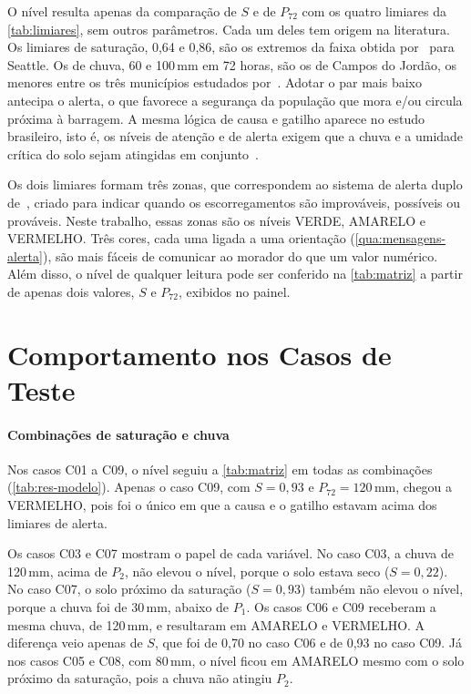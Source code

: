 O nível resulta apenas da comparação de $S$ e de $P_{72}$ com os quatro
limiares da \autoref{tab:limiares}, sem outros parâmetros. Cada um deles
tem origem na literatura.
Os limiares de saturação, 0,64 e 0,86, são os extremos da faixa obtida
por~ para Seattle. Os de
chuva, 60 e 100\,mm em 72 horas, são os de Campos do Jordão, os menores
entre os três municípios estudados por~.
Adotar o par mais baixo antecipa o alerta, o que favorece a segurança da
população que mora e/ou circula próxima à barragem. A mesma lógica de causa e gatilho aparece no estudo brasileiro, isto é, os níveis de atenção e de alerta exigem que a chuva e a
umidade crítica do solo sejam atingidas em conjunto~\cite[p.~74, Tabela~3]{mendes2020proposicao}.

Os dois limiares formam três zonas, que correspondem ao sistema de alerta
duplo de~, criado para indicar
quando os escorregamentos são improváveis, possíveis ou prováveis. Neste
trabalho, essas zonas são os níveis VERDE, AMARELO e VERMELHO.
Três cores, cada uma ligada a uma orientação
(\autoref{qua:mensagens-alerta}), são mais fáceis de comunicar ao morador
do que um valor numérico. Além disso, o nível de qualquer leitura pode
ser conferido na \autoref{tab:matriz} a partir de apenas dois valores,
$S$ e $P_{72}$, exibidos no painel.

\section{Comportamento nos Casos de Teste}
\label{sec:disc-casos}

\paragraph*{Combinações de saturação e chuva}

Nos casos C01 a C09, o nível seguiu a \autoref{tab:matriz} em todas as
combinações (\autoref{tab:res-modelo}). Apenas o caso C09, com
$S = 0{,}93$ e $P_{72} = 120$\,mm, chegou a VERMELHO, pois foi o único em
que a causa e o gatilho estavam acima dos limiares de alerta.

Os casos C03 e C07 mostram o papel de cada variável. No caso C03, a
chuva de 120\,mm, acima de $P_2$, não elevou o nível, porque o solo
estava seco ($S = 0{,}22$). No caso C07, o solo próximo da saturação
($S = 0{,}93$) também não elevou o nível, porque a chuva foi de
30\,mm, abaixo de $P_1$.
Os casos C06 e C09 receberam a mesma chuva, de 120\,mm, e resultaram em
AMARELO e VERMELHO. A diferença veio apenas de $S$, que foi de 0,70 no caso C06 e de
0,93 no caso C09. Já nos casos C05 e C08, com 80\,mm, o nível ficou em
AMARELO mesmo com o solo próximo da saturação, pois a chuva não atingiu
$P_2$.

